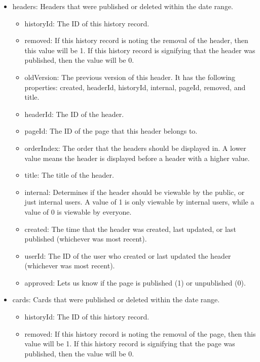 \documentclass[onecolumn, draftclsnofoot,10pt, compsoc, usenames, dvipsnames]{IEEEtran}
\begin{document}
\begin{itemize}
\begin{itemize}
    \item internal: Determines if the page should be viewable by the public, or just internal users. A value of 1 is only viewable by internal users, while a value of 0 is viewable by everyone.
  \end{itemize}
  \item headers: Headers that were published or deleted within the date range.
  \begin{itemize}
    \item historyId: The ID of this history record.
    \item removed: If this history record is noting the removal of the header, then this value will be 1. If this history record is signifying that the header was published, then the value will be 0.
    \item oldVersion: The previous version of this header. It has the following properties: created, headerId, historyId, internal, pageId, removed, and title.
    \item headerId: The ID of the header.
    \item pageId: The ID of the page that this header belongs to.
    \item orderIndex: The order that the headers should be displayed in. A lower value means the header is displayed before a header with a higher value.
    \item title: The title of the header.
    \item internal: Determines if the header should be viewable by the public, or just internal users. A value of 1 is only viewable by internal users, while a value of 0 is viewable by everyone.
    \item created: The time that the header was created, last updated, or last published (whichever was most recent).
    \item userId: The ID of the user who created or last updated the header (whichever was most recent).
    \item approved: Lets us know if the page is published (1) or unpublished (0).
  \end{itemize}
  \item cards: Cards that were published or deleted within the date range.
  \begin{itemize}
    \item historyId: The ID of this history record.
    \item removed: If this history record is noting the removal of the page, then this value will be 1. If this history record is signifying that the page was published, then the value will be 0.

\end{itemize}
\end{itemize}
\end{document}
